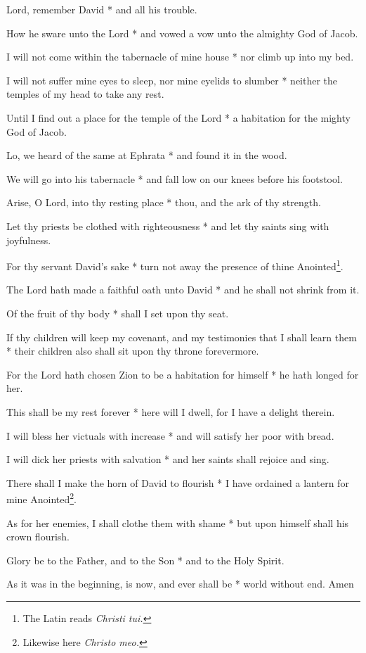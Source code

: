 Lord, remember David * and all his trouble.

How he sware unto the Lord * and vowed a vow unto the almighty God of Jacob.

I will not come within the tabernacle of mine house * nor climb up into my bed.

I will not suffer mine eyes to sleep, nor mine eyelids to slumber * neither the temples of my head to take any rest.

Until I find out a place for the temple of the Lord * a habitation for the mighty God of Jacob.

Lo, we heard of the same at Ephrata * and found it in the wood.

We will go into his tabernacle * and fall low on our knees before his footstool.

Arise, O Lord, into thy resting place * thou, and the ark of thy strength.

Let thy priests be clothed with righteousness * and let thy saints sing with joyfulness.

For thy servant David's sake * turn not away the presence of thine Anointed\footnote{The Latin reads \textit{Christi tui.}}.

The Lord hath made a faithful oath unto David * and he shall not shrink from it.

Of the fruit of thy body * shall I set upon thy seat.

If thy children will keep my covenant, and my testimonies that I shall learn them * their children also shall sit upon thy throne forevermore.

For the Lord hath chosen Zion to be a habitation for himself * he hath longed for her.

This shall be my rest forever * here will I dwell, for I have a delight therein.

I will bless her victuals with increase * and will satisfy her poor with bread.

I will dick her priests with salvation * and her saints shall rejoice and sing.

There shall I make the horn of David to flourish * I have ordained a lantern for mine Anointed\footnote{Likewise here \textit{Christo meo.}}.

As for her enemies, I shall clothe them with shame * but upon himself shall his crown flourish.

Glory be to the Father, and to the Son * and to the Holy Spirit.

As it was in the beginning, is now, and ever shall be * world without end. Amen